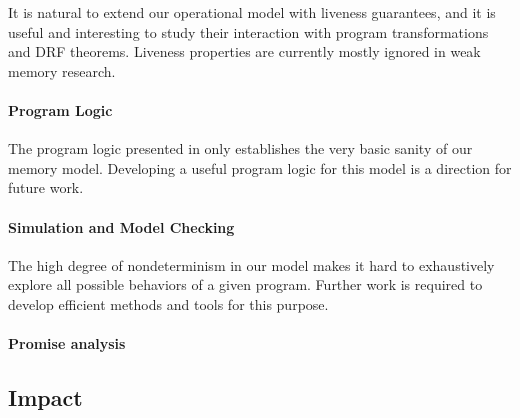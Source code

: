 It is natural to extend our operational model with liveness guarantees,
and it is useful and interesting to study their interaction with
 program transformations and DRF theorems.
Liveness properties are currently mostly ignored in weak memory research.




\paragraph{Program Logic}

The program logic presented in  only establishes the very basic sanity of our memory model.
Developing a useful program logic for this model is a direction for future work.



\paragraph{Simulation and Model Checking}

The high degree of nondeterminism in our model makes it hard to 
exhaustively explore all possible behaviors of a given program.
Further work is required to develop efficient methods and tools for this purpose.





\paragraph{Promise analysis}



\subsection{Impact}




